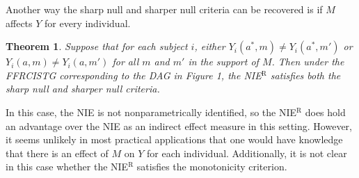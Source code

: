 \documentclass[12pt]{article}
\newtheorem{theorem}{Theorem}
\begin{document}
Another way the sharp null and sharper null criteria can be recovered is if %
$M$ affects $Y$ for every individual. 
\begin{theorem}
    \label{thm:m-always-affects-y}
    Suppose that for each subject $i$, either $Y_i(a^*,m)\neq Y_i(a^*,m')$ or $Y_i(a,m)\neq Y_i(a,m')$ for all $m$ and $m'$ in the support of $M$. Then under the FFRCISTG corresponding to the DAG in Figure 1, the NIE$^{\text{R}}$ satisfies both the sharp null and sharper null criteria.
\end{theorem}
In this case, the NIE is not nonparametrically identified, so the NIE$^{\text{R}}$ does hold an advantage over the NIE as an indirect effect measure in this setting. However, it seems unlikely in most practical applications that one would have knowledge that there is an effect of $M$ on $Y$ for each individual. Additionally, it is not clear in this case whether the NIE$^{\text{R}}$ satisfies the monotonicity criterion.
\end{document}
